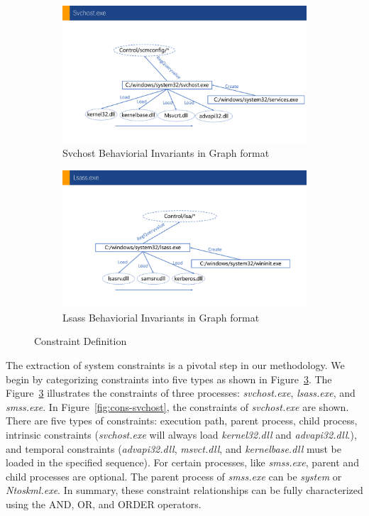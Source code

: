 \begin{figure}[h]
  \begin{subfigure}{.5\textwidth}
      \includegraphics[width=\textwidth]{figs/svchost.pdf}
      \caption{Svchost Behaviorial Invariants in Graph format}
      \label{fig:con-svchost-tree}
  \end{subfigure}
  \hfill
  \begin{subfigure}{.5\textwidth}
      \includegraphics[width=\textwidth]{figs/lsass.pdf}
      \caption{Lsass Behaviorial Invariants in Graph format}
      \label{fig:con-lsass}
  \end{subfigure}
  \caption{Constraint Definition}
  \label{fig:cons-def}
 \end{figure}


The extraction of system constraints is a pivotal step in our methodology. We begin by categorizing constraints into five types as shown in Figure~\ref{fig:cons-def}.
The Figure~\ref{fig:cons-def} illustrates the constraints of three processes: \textit{svchost.exe}, \textit{lsass.exe}, and \textit{smss.exe}. In Figure~\ref{fig:cons-svchost}, the constraints of \textit{svchost.exe} are shown. There are five types of constraints: execution path, parent process, child process, intrinsic constraints (\textit{svchost.exe} will always load \textit{kernel32.dll} and \textit{advapi32.dll}.), and temporal constraints (\textit{advapi32.dll}, \textit{msvct.dll}, and \textit{kernelbase.dll} must be loaded in the specified sequence).
For certain processes, like \textit{smss.exe}, parent and child processes are optional. The parent process of \textit{smss.exe} can be \textit{system} or \textit{Ntoskml.exe}.
In summary, these constraint relationships can be fully characterized using the AND, OR, and ORDER operators.

